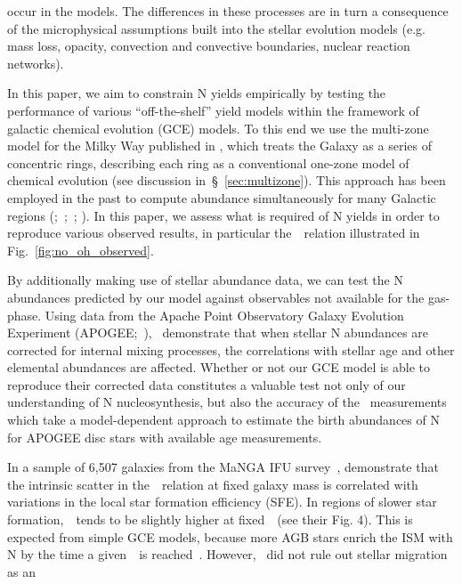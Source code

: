 \documentclass[ms.tex]{subfiles}
\begin{document}
occur in the models.
The differences in these processes are in turn a consequence of the
microphysical assumptions built into the stellar evolution models (e.g. mass
loss, opacity, convection and convective boundaries, nuclear reaction networks).
\par
In this paper, we aim to constrain N yields empirically by testing the
performance of various ``off-the-shelf'' yield models within the framework of
galactic chemical evolution (GCE) models.
To this end we use the multi-zone model for the Milky Way published in
\citet{Johnson2021}, which treats the Galaxy as a series of concentric rings,
describing each ring as a conventional one-zone model of chemical evolution
(see discussion in~\S~\ref{sec:multizone}).
This approach has been employed in the past to compute abundance simultaneously
for many Galactic regions (\citealp{Matteucci1989, Wyse1989, Prantzos1995,
Schoenrich2009};~\citealp*{Minchev2013, Minchev2014};~\citealp{Minchev2017};
\citealp*{Sharma2021}).
In this paper, we assess what is required of N yields in order to reproduce
various observed results, in particular the~\ohno~relation illustrated in
Fig.~\ref{fig:no_oh_observed}.
\par
By additionally making use of stellar abundance data, we can test the N
abundances predicted by our model against observables not available for the
gas-phase.
Using data from the Apache Point Observatory Galaxy Evolution Experiment
(APOGEE;~\citealp{Majewski2017}),~\citet{Vincenzo2021} demonstrate that when
stellar N abundances are corrected for internal mixing processes, the
correlations with stellar age and other elemental abundances are affected.
Whether or not our GCE model is able to reproduce their corrected data
constitutes a valuable test not only of our understanding of N nucleosynthesis,
but also the accuracy of the~\citet{Vincenzo2021} measurements which take a
model-dependent approach to estimate the birth abundances of N for APOGEE disc
stars with available age measurements.
\par
In a sample of 6,507 galaxies from the MaNGA IFU survey~\citep{Bundy2015},
\citet{Schaefer2020} demonstrate that the intrinsic scatter in
the~\ohno~relation at fixed galaxy mass is correlated with variations in the
local star formation efficiency (SFE).
In regions of slower star formation,~\no~tends to be slightly higher at
fixed~\oh~(see their Fig. 4).
This is expected from simple GCE models, because more AGB stars enrich the
ISM with N by the time a given~\oh~is reached~\citep[e.g.][]{Molla2006,
Vincenzo2016a}.
However,~\citet{Schaefer2020} did not rule out stellar migration as an
\end{document}
